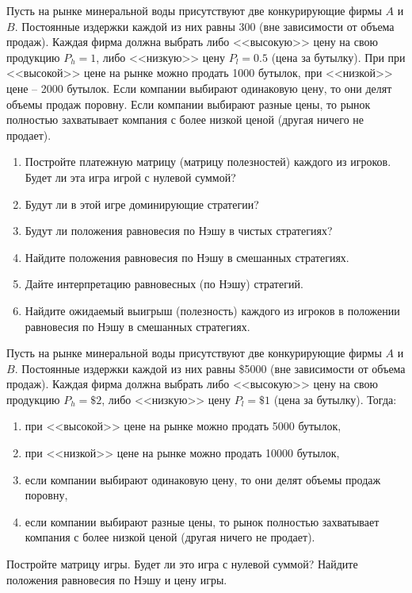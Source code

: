 \begin{exercise}
Пусть на рынке минеральной воды присутствуют две конкурирующие фирмы $A$ и $B$. 
Постоянные издержки каждой из них равны 300
(вне зависимости от объема продаж). Каждая фирма
должна выбрать либо <<высокую>> цену на свою продукцию $P_h=1$, 
либо <<низкую>> цену $P_l=0.5$ (цена за бутылку). При при <<высокой>> цене на 
рынке можно продать 1000 бутылок, при <<низкой>> цене -- 2000 бутылок.
Если компании выбирают одинаковую цену, то они делят объемы продаж поровну.
Если компании выбирают разные цены, то рынок полностью захватывает компания
с более низкой ценой (другая ничего не продает).
\begin{enumerate}
	\item Постройте платежную матрицу (матрицу полезностей) каждого из игроков. 
	Будет ли эта игра игрой с нулевой суммой? %
	\item Будут ли в этой игре доминирующие стратегии? %
	\item Будут ли положения равновесия по Нэшу в чистых стратегиях? %
	\item Найдите положения равновесия по Нэшу в смешанных стратегиях.
	\item Дайте интерпретацию равновесных (по Нэшу) стратегий.
	\item Найдите ожидаемый выигрыш (полезность) каждого из игроков
	в положении равновесия по Нэшу в смешанных стратегиях.
\end{enumerate}
\end{exercise}

\begin{exercise}
Пусть на рынке минеральной воды присутствуют две конкурирующие фирмы $A$ и $B$. 
Постоянные издержки каждой из них равны \$5000
(вне зависимости от объема продаж). Каждая фирма
должна выбрать либо <<высокую>> цену на свою продукцию $P_h=\$2$, либо <<низкую>> цену $P_l=\$1$
(цена за бутылку). Тогда:
\begin{enumerate}
	\item при <<высокой>> цене на рынке можно продать 5000 бутылок,
	\item при <<низкой>> цене на рынке можно продать 10000 бутылок,
	\item если компании выбирают одинаковую цену, то они делят объемы продаж поровну,
	\item если компании выбирают разные цены, то рынок полностью захватывает компания
	с более низкой ценой (другая ничего не продает).
\end{enumerate}
Постройте матрицу игры. Будет ли это игра с нулевой суммой? Найдите положения равновесия
по Нэшу и цену игры.
\end{exercise}

